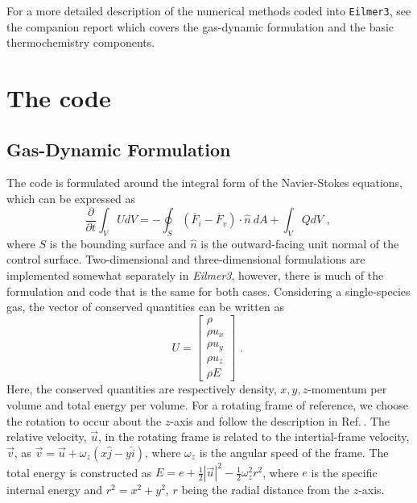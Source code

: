 \documentclass[12pt,a4paper,twoside]{article}
\begin{document}
\medskip
For a more detailed description of the numerical methods coded into \texttt{Eilmer3}, 
see the companion report \cite{jacobs_etal_2010b}
which covers the gas-dynamic formulation and the basic thermochemistry components.

\cleardoublepage

\section{The code}

\subsection{Gas-Dynamic Formulation}
\label{formulation-sec}
%
The code is formulated around the integral form of the Navier-Stokes equations, which can be expressed as
\begin{equation}
 \frac{\partial}{\partial t} \int_{V} U dV = - \oint_{S} \left ( \overline{F}_{i} - \overline{F}_{v} \right ) \cdot \hat{n}~dA + \int_{V} Q dV \text{ , }
 \label{eq:NS}
\end{equation}
where $S$ is the bounding surface and $\hat{n}$ is the outward-facing unit normal of the control surface.
Two-dimensional and three-dimensional formulations are implemented somewhat separately in \textit{Eilmer3},
however, there is much of the formulation and code that is the same for both cases. 
Considering a single-species gas, the vector of conserved quantities can be written as
\begin{equation}
 U = \left [ \begin{array}{c} \rho \\ 
                              \rho u_{x} \\ 
                              \rho u_{y} \\ 
                              \rho u_{z} \\ 
                              \rho E
             \end{array} \right ] \text{ . }
 \label{eq:U_vector_3D}
\end{equation}
Here, the conserved quantities are respectively density, $x, y, z$-momentum per volume and total energy per volume.
For a rotating frame of reference, we choose the rotation to occur about the $z$-axis and follow the 
description in Ref.\,\cite{hirsch_2007a}. 
The relative velocity, $\vec{u}$, in the rotating frame is related to the intertial-frame velocity, $\vec{v}$,
as $\vec{v} = \vec{u} + \omega_z (x \hat{j} - y \hat{i})$, where $\omega_z$ is the angular speed of the frame.
The total energy is constructed as $E = e + \frac{1}{2} |\vec{u}|^2 - \frac{1}{2} \omega_z^2 r^2$, 
where $e$ is the specific internal energy and $r^2 = x^2 + y^2$, $r$ being the radial distance from the $z$-axis.
\end{document}
